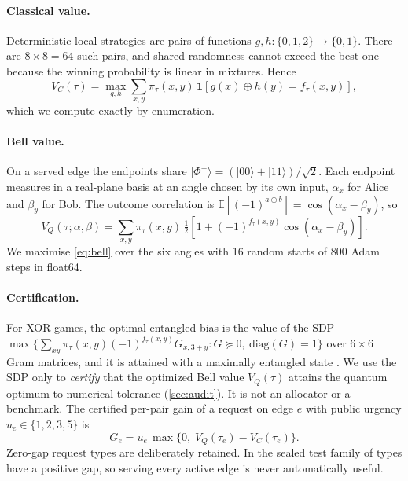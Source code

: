 \documentclass[11pt,a4paper]{article}
\newcommand{\xor}{\mathbin{\oplus}}
\newcommand{\E}{\mathbb{E}}
\begin{document}
\paragraph{Classical value.} Deterministic local strategies are pairs of functions $g,h:\{0,1,2\}\to\{0,1\}$. There are $8\times8=64$ such pairs, and shared randomness cannot exceed the best one because the winning probability is linear in mixtures. Hence
\begin{equation}
  V_C(\tau) = \max_{g,h}\sum_{x,y}\pi_\tau(x,y)\,\mathbf{1}\!\left[g(x)\xor h(y)=f_\tau(x,y)\right],
  \label{eq:classical}
\end{equation}
which we compute exactly by enumeration.

\paragraph{Bell value.} On a served edge the endpoints share $|\Phi^+\rangle=(|00\rangle+|11\rangle)/\sqrt2$. Each endpoint measures in a real-plane basis at an angle chosen by its own input, $\alpha_x$ for Alice and $\beta_y$ for Bob. The outcome correlation is $\E[(-1)^{a\xor b}]=\cos(\alpha_x-\beta_y)$, so
\begin{equation}
  V_Q(\tau;\alpha,\beta)=\sum_{x,y}\pi_\tau(x,y)\,\tfrac12\!\left[1+(-1)^{f_\tau(x,y)}\cos(\alpha_x-\beta_y)\right].
  \label{eq:bell}
\end{equation}
We maximise \cref{eq:bell} over the six angles with 16 random starts of 800 Adam steps in float64.

\paragraph{Certification.} For XOR games, the optimal entangled bias is the value of the SDP $\max\{\sum_{xy}\pi_\tau(x,y)(-1)^{f_\tau(x,y)}G_{x,3+y}: G\succeq0,\ \mathrm{diag}(G)=1\}$ over $6\times6$ Gram matrices, and it is attained with a maximally entangled state \cite{tsirelson1980quantum,cleve2004consequences}. We use the SDP only to \emph{certify} that the optimized Bell value $V_Q(\tau)$ attains the quantum optimum to numerical tolerance (\cref{sec:audit}). It is not an allocator or a benchmark. The certified per-pair gain of a request on edge $e$ with public urgency $u_e\in\{1,2,3,5\}$ is
\begin{equation}
  G_e = u_e\,\max\{0,\;V_Q(\tau_e)-V_C(\tau_e)\}.
  \label{eq:gain}
\end{equation}
Zero-gap request types are deliberately retained. In the sealed test family \testPositiveTypes{} of \testTypes{} types have a positive gap, so serving every active edge is never automatically useful.
\end{document}

